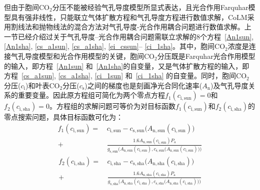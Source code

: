 但由于胞间$\mathrm {CO_2}$分压不能被经验气孔导度模型所显式表达，且光合作用Farquhar模型具有强非线性，只能联立气体扩散方程和气孔导度方程进行数值求解，CoLM采用割线法和抛物线法的混合方法对气孔导度-光合作用耦合问题进行数值求解。上一节已经介绍过关于气孔导度--光合作用耦合问题需联立求解的8个方程~\eqref{An1sun}, \eqref{An1sha}, \eqref{cs_a1sun}, \eqref{cs_a1sha}, \eqref{ei_cssun}--%
\eqref{ci_1sha}。其中，胞间$\mathrm{CO_2}$浓度是连接气孔导度模型和光合作用模型的关键，胞间$\mathrm{CO_2}$分压既是Farquhar光合作用模型的输入，即方程~\eqref{An1sun} 和~\eqref{An1sha}的自变量，又是气体扩散方程的输入，即方程~\eqref{cs_a1sun}, \eqref{cs_a1sha}, \eqref{ci_1sun} 和~\eqref{ci_1sha} 的自变量。同时，胞间$\mathrm{CO_2}$分压($c_{\mathrm{i}}$)和叶表$\mathrm{CO_2}$分压($c_{\mathrm{s}}$)之间的梯度也是刻画净光合同化速率($A_{\mathrm{n}}$)及气孔导度关系的重要变量。因此原方程组可简化为两个零点方程$f_1(c_{\mathrm{i,sun}})=0$和$f_2(c_{\mathrm{i,sha}})=0$。方程组的求解问题可等价为对目标函数$f_1(c_{\mathrm{i,sun}})$和$f_2(c_{\mathrm{i,sha}})$的零点搜索问题，具体目标函数可化为：
\begin{align}\label{f1_cisun}
f_{\mathrm{1}}\left(c_{\mathrm{i,sun}}\right)=&\,c_{\mathrm{i,sun}}-c_{\mathrm{s,sun}}\big(A_{\mathrm{n,sun}}\left(c_{\mathrm{i,sun}}\right)\big) \nonumber \\[1ex]
+& \, \frac{1.6A_{\mathrm{n,sun}}\left(c_{\mathrm{i,sun}}\right)P_{\mathrm {a}} }{g_{\mathrm{s,sun}}\Big(A_{\mathrm{n,sun}}\left(c_{\mathrm{i,sun}}\right),c_{\mathrm{s,sun}}\big(A_{\mathrm{n,sun}}\left(c_{\mathrm{i,sun}}\right)\big)\Big)}
\end{align}
\begin{align}\label{f1_cisha}
f_{\mathrm{2}}\left(c_{\mathrm{i,sha}}\right)=&\,c_{\mathrm{i,sha}}-c_{\mathrm{s,sha}}\big(A_{\mathrm{n,sha}}\left(c_{\mathrm{i,sha}}\right)\big) \nonumber \\[1ex]
+& \, \frac{1.6A_{\mathrm{n,sha}}\left(c_{\mathrm{i,sha}}\right)P_{\mathrm {a}} }{g_{\mathrm{s,sha}}\Big(A_{\mathrm{n,sha}}\left(c_{\mathrm{i,sha}}\right),c_{\mathrm{s,sha}}\big(A_{\mathrm{n,sha}}\left(c_{\mathrm{i,sha}}\right)\big)\Big)}
\end{align}

